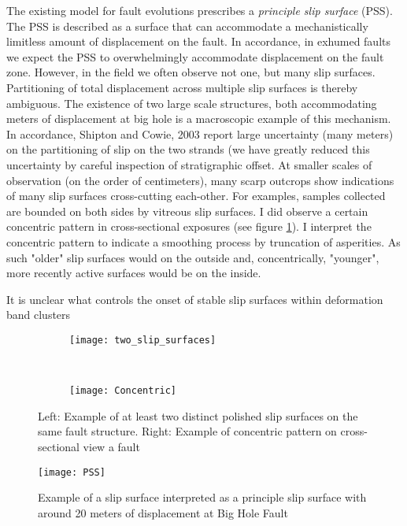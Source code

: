 \documentclass[12pt,a4paper]{article}
\begin{document}
{The existing model for fault evolutions prescribes a \textit{principle slip surface} (PSS). The PSS is described as a surface that can accommodate a mechanistically limitless amount of displacement on the fault. In accordance, in exhumed faults we expect the PSS to overwhelmingly accommodate displacement on the fault zone. However, in the field we often observe not one, but many slip surfaces. Partitioning of total displacement across multiple slip surfaces is thereby ambiguous. The existence of two large scale structures, both accommodating meters of displacement at big hole is a macroscopic example of this mechanism. In accordance, Shipton and Cowie, 2003 report large uncertainty (many meters) on the partitioning of slip on the two strands (we have greatly reduced this uncertainty by careful inspection of stratigraphic offset. At smaller scales of observation (on the order of centimeters), many scarp outcrops show indications of many slip surfaces cross-cutting each-other. For examples, samples collected are bounded on both sides by vitreous slip surfaces.  I did observe a certain concentric pattern in cross-sectional exposures (see figure \ref{many_surf}). I interpret the concentric pattern to indicate a smoothing process by truncation of asperities. As such "older" slip surfaces would on the outside and, concentrically, "younger", more recently active surfaces would be on the inside.

It is unclear what controls the onset of stable slip surfaces within deformation band clusters

\begin{figure}
	\centering
	\begin{subfigure}[b]{0.4\textwidth}
		\texttt{[image: two\_slip\_surfaces]}
	\end{subfigure}
	~
	\begin{subfigure}[b]{0.4\textwidth}
		\texttt{[image: Concentric]}
	\end{subfigure}
	\caption{Left: Example of at least two distinct polished slip surfaces on the same fault structure. Right: Example of concentric pattern on cross-sectional view a fault}
	\label{many_surf}
\end{figure}	

\begin{figure}
	\centering
    \texttt{[image: PSS]}
	
	\caption{Example of a slip surface interpreted as a principle slip surface with around 20 meters of displacement at Big Hole Fault}
	\label{PSS}
\end{figure}


}
\end{document}
